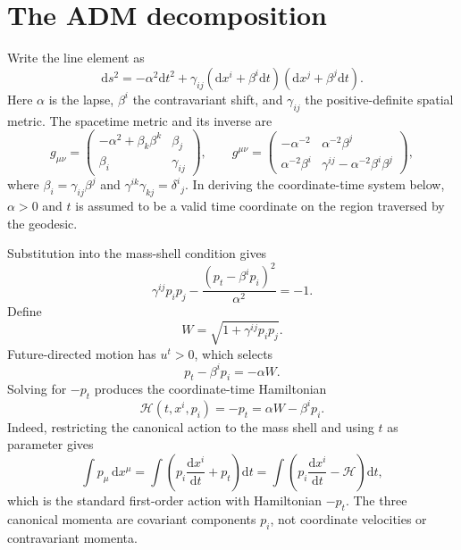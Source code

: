 \documentclass[11pt]{article}
\newcommand{\dd}{\mathrm{d}}
\newcommand{\Ham}{\mathcal{H}}
\begin{document}
\section{The ADM decomposition}

Write the line element as
\begin{equation}
 \dd s^2=-\alpha^2\dd t^2
 +\gamma_{ij}(\dd x^i+\beta^i\dd t)
                  (\dd x^j+\beta^j\dd t).
 \label{eq:adm-line-element}
\end{equation}
Here \(\alpha\) is the lapse, \(\beta^i\) the contravariant shift, and
\(\gamma_{ij}\) the positive-definite spatial metric.  The spacetime metric
and its inverse are
\begin{equation}
 g_{\mu\nu}=
 \begin{pmatrix}
 -\alpha^2+\beta_k\beta^k & \beta_j\\
 \beta_i & \gamma_{ij}
 \end{pmatrix},
 \qquad
 g^{\mu\nu}=
 \begin{pmatrix}
 -\alpha^{-2} & \alpha^{-2}\beta^j\\
 \alpha^{-2}\beta^i &
 \gamma^{ij}-\alpha^{-2}\beta^i\beta^j
 \end{pmatrix},
 \label{eq:adm-matrices}
\end{equation}
where \(\beta_i=\gamma_{ij}\beta^j\) and
\(\gamma^{ik}\gamma_{kj}=\delta^i{}_j\).  In deriving the coordinate-time
system below, \(\alpha>0\) and \(t\) is assumed to be a valid time coordinate
on the region traversed by the geodesic.

Substitution into the mass-shell condition gives
\begin{equation}
 \gamma^{ij}p_i p_j
 -\frac{(p_t-\beta^i p_i)^2}{\alpha^2}=-1.
 \label{eq:adm-mass-shell}
\end{equation}
Define
\begin{equation}
 W=\sqrt{1+\gamma^{ij}p_i p_j}.
 \label{eq:W-definition}
\end{equation}
Future-directed motion has \(u^t>0\), which selects
\begin{equation}
 p_t-\beta^i p_i=-\alpha W.
 \label{eq:future-branch}
\end{equation}
Solving for \(-p_t\) produces the coordinate-time Hamiltonian
\begin{equation}
 \boxed{\Ham(t,x^i,p_i)=-p_t=\alpha W-\beta^i p_i.}
 \label{eq:reduced-hamiltonian}
\end{equation}
Indeed, restricting the canonical action to the mass shell and using \(t\)
as parameter gives
\begin{equation}
 \int p_\mu\,\dd x^\mu
 =\int\left(p_i\frac{\dd x^i}{\dd t}+p_t\right)\dd t
 =\int\left(p_i\frac{\dd x^i}{\dd t}-\Ham\right)\dd t,
 \label{eq:reduced-action}
\end{equation}
which is the standard first-order action with Hamiltonian \(-p_t\).
The three canonical momenta are covariant components \(p_i\), not coordinate
velocities or contravariant momenta.
\end{document}
